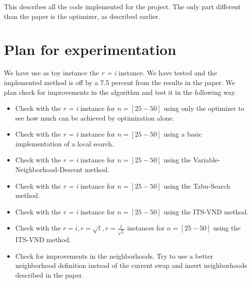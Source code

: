 \documentclass{article}
\begin{document}
This describes all the code implemented for the project. The only part different than the paper is the optimizer, as described earlier.



\section{Plan for experimentation}\label{sec:solution}%
We have use as toy instance the \textit{r = i} instance. We have tested and the implemented method is off by a 7.5 percent from the results in the paper. We plan check for improvements in the algorithm and test it in the following way.

\begin{itemize}
\item Check with the \textit{r = i} instance for $n=[25-50]$ using only the optimizer to see how much can be achieved by optimization alone.
\item Check with the \textit{r = i} instance for $n=[25-50]$ using a basic implementation of a local search.
\item Check with the \textit{r = i} instance for $n=[25-50]$ using the Variable-Neighborhood-Descent method.
\item Check with the \textit{r = i} instance for $n=[25-50]$ using the Tabu-Search method.
\item Check with the \textit{r = i} instance for $n=[25-50]$ using the ITS-VND method.
\item Check with the $r=i,r=\sqrt{i},r=\frac{1}{\sqrt{i}}$ instances for $n=[25-50]$ using the ITS-VND method.
\item Check for improvements in the neighborhoods. Try to use a better neighborhood definition instead of the current swap and insert neighborhoods described in the paper.
\end{itemize}


\end{document}
